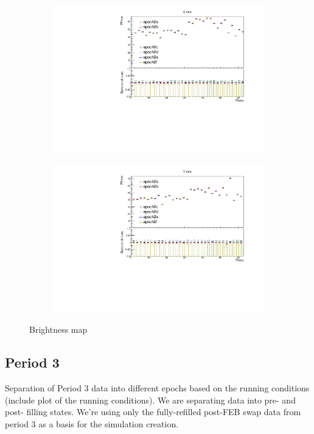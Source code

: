 \documentclass[12pt,a4paper]{article}
\begin{document}
\begin{figure}[hbtp]
\centering
\begin{subfigure}[b]{\textwidth}
\centering
\includegraphics[width=\textwidth]{Plots/Attenprofs_P2Data_PlanePE_X_Combined.pdf}
\end{subfigure}
\begin{subfigure}[b]{\textwidth}
\centering
\includegraphics[width=\textwidth]{Plots/Attenprofs_P2Data_PlanePE_Y_Combined.pdf}
\end{subfigure}
\caption{Brightness map}
\end{figure}

\subsection{Period 3}
Separation of Period 3 data into different epochs based on the running conditions (include plot of the running conditions). We are separating data into pre- and post- filling states. We're using only the fully-refilled post-FEB swap data from period 3 as a basis for the simulation creation.
\end{document}
